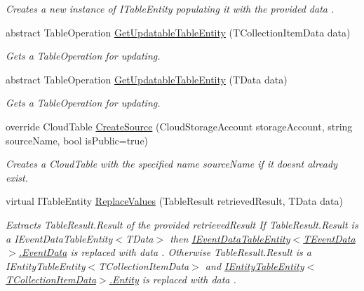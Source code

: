 \begin{DoxyCompactItemize}
\begin{DoxyCompactList}\small\item\em Creates a new instance of I\+Table\+Entity populating it with the provided {\itshape data} . \end{DoxyCompactList}\item 
abstract Table\+Operation \hyperlink{classCqrs_1_1Azure_1_1BlobStorage_1_1TableStorageStore_a1308b107766a375b7b8dcc92d9080393_a1308b107766a375b7b8dcc92d9080393}{Get\+Updatable\+Table\+Entity} (T\+Collection\+Item\+Data data)
\begin{DoxyCompactList}\small\item\em Gets a Table\+Operation for updating. \end{DoxyCompactList}\item 
abstract Table\+Operation \hyperlink{classCqrs_1_1Azure_1_1BlobStorage_1_1TableStorageStore_ae476c94b77d9c602aef934bd8c1b20ea_ae476c94b77d9c602aef934bd8c1b20ea}{Get\+Updatable\+Table\+Entity} (T\+Data data)
\begin{DoxyCompactList}\small\item\em Gets a Table\+Operation for updating. \end{DoxyCompactList}\item 
override Cloud\+Table \hyperlink{classCqrs_1_1Azure_1_1BlobStorage_1_1TableStorageStore_ad504317a3b2c07172f50b8e7b8d0f78e_ad504317a3b2c07172f50b8e7b8d0f78e}{Create\+Source} (Cloud\+Storage\+Account storage\+Account, string source\+Name, bool is\+Public=true)
\begin{DoxyCompactList}\small\item\em Creates a Cloud\+Table with the specified name {\itshape source\+Name}  if it doesn\textquotesingle{}t already exist. \end{DoxyCompactList}\item 
virtual I\+Table\+Entity \hyperlink{classCqrs_1_1Azure_1_1BlobStorage_1_1TableStorageStore_adc625eceee6e2b190997a771740e01b9_adc625eceee6e2b190997a771740e01b9}{Replace\+Values} (Table\+Result retrieved\+Result, T\+Data data)
\begin{DoxyCompactList}\small\item\em Extracts Table\+Result.\+Result of the provided {\itshape retrieved\+Result}  If Table\+Result.\+Result is a I\+Event\+Data\+Table\+Entity$<$\+T\+Data$>$ then \hyperlink{interfaceCqrs_1_1Azure_1_1BlobStorage_1_1IEventDataTableEntity_aa7b1f06172ce68c2cb2248be422edfe5_aa7b1f06172ce68c2cb2248be422edfe5}{I\+Event\+Data\+Table\+Entity$<$\+T\+Event\+Data$>$.\+Event\+Data} is replaced with {\itshape data} . Otherwise Table\+Result.\+Result is a I\+Entity\+Table\+Entity$<$\+T\+Collection\+Item\+Data$>$ and \hyperlink{interfaceCqrs_1_1Azure_1_1BlobStorage_1_1IEntityTableEntity_a06bd38e994772fa43bf8f456c1b3d6e2_a06bd38e994772fa43bf8f456c1b3d6e2}{I\+Entity\+Table\+Entity$<$\+T\+Collection\+Item\+Data$>$.\+Entity} is replaced with {\itshape data} . \end{DoxyCompactList}\item 

\end{DoxyCompactItemize}
